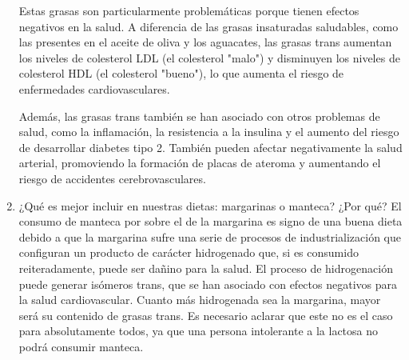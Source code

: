 \documentclass{article}
\begin{document}
\begin{enumerate}
    Estas grasas son particularmente problemáticas porque tienen efectos negativos en la salud. A diferencia de las grasas insaturadas saludables, como las presentes en el aceite de oliva y los aguacates, las grasas trans aumentan los niveles de colesterol LDL (el colesterol "malo") y disminuyen los niveles de colesterol HDL (el colesterol "bueno"), lo que aumenta el riesgo de enfermedades cardiovasculares.
    
    Además, las grasas trans también se han asociado con otros problemas de salud, como la inflamación, la resistencia a la insulina y el aumento del riesgo de desarrollar diabetes tipo 2. También pueden afectar negativamente la salud arterial, promoviendo la formación de placas de ateroma y aumentando el riesgo de accidentes cerebrovasculares.
    
    \item ¿Qué es mejor incluir en nuestras dietas: margarinas o manteca? ¿Por qué?
    El consumo de manteca por sobre el de la margarina es signo de una buena dieta debido a que la margarina sufre una serie de procesos de industrialización que configuran un producto de carácter hidrogenado que, si es consumido reiteradamente, puede ser dañino para la salud. El proceso de hidrogenación puede generar isómeros trans, que se han asociado con efectos negativos para la salud cardiovascular. Cuanto más hidrogenada sea la margarina, mayor será su contenido de grasas trans. Es necesario aclarar que este no es el caso para absolutamente todos, ya que una persona intolerante a la lactosa no podrá consumir manteca.
\end{enumerate}
\end{document}
